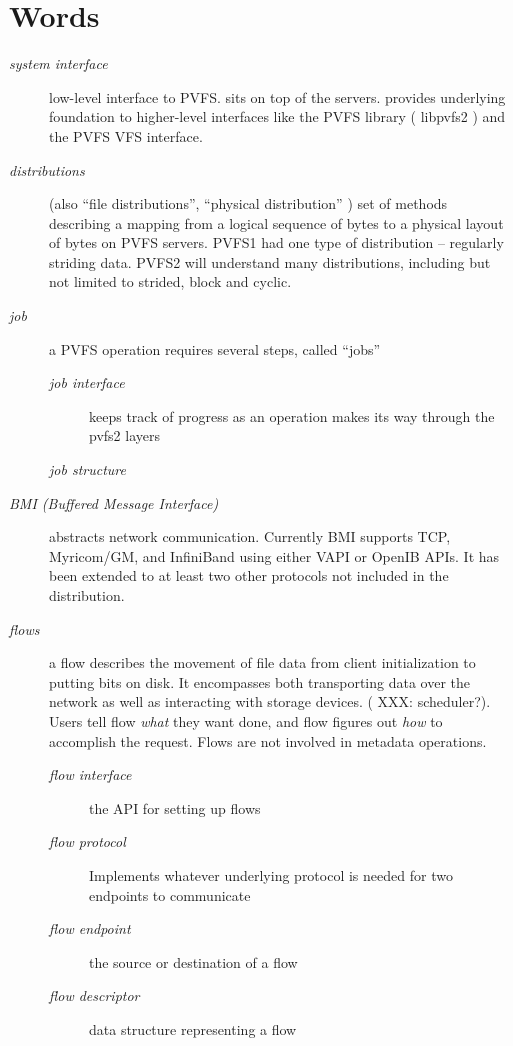 \documentclass[10pt]{article} %
\begin{document}
\section{Words}
\begin{description}
\item[\em system interface] low-level interface to PVFS.  sits on top of
    the servers.  provides underlying foundation to higher-level
    interfaces like the PVFS library ( libpvfs2 ) and the PVFS VFS
    interface. 
\item[\em distributions] (also ``file distributions'', ``physical
    distribution'' ) set
    of methods describing a mapping from a logical sequence of bytes to
    a physical layout of bytes on PVFS servers.  PVFS1 had one type of
    distribution --  regularly striding data.  PVFS2 will understand
    many distributions, including but not limited to strided, block and
    cyclic. 

\item[\em job ] a PVFS operation requires several steps, called ``jobs''
\begin{description}
  \item[\em job interface] keeps track of progress as an operation
   makes its way through the pvfs2 layers
  \item[\em job structure] 
\end{description}

\item[\em BMI (Buffered Message Interface)] abstracts network communication.  
   Currently BMI supports
   TCP, Myricom/GM, and InfiniBand using either VAPI or OpenIB APIs.
   It has been extended to at least two other protocols not included in the
   distribution.
   
\item[\em flows] a flow describes the movement of file data from client
   initialization to putting bits on disk.  It encompasses both
   transporting data over the network as well as interacting with
   storage devices. ( XXX: scheduler?).  Users tell flow {\em what} they
   want done, and flow figures out {\em how} to accomplish the request.
   Flows are not involved in metadata operations.
   \begin{description}
   \item[\em flow interface] the API for setting up flows
   \item[\em flow protocol] Implements whatever underlying protocol is
   needed for two endpoints to communicate
   \item[\em flow endpoint] the source or destination of a flow 
   \item[\em flow descriptor] data structure representing a flow
   \end{description}
   

\end{description}
\end{document}
